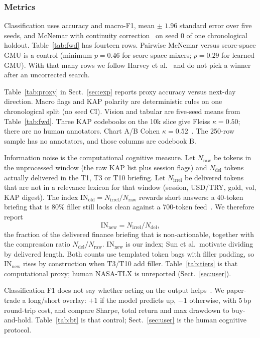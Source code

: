 \documentclass{llncs}
\begin{document}
\subsubsection{Metrics}
\label{sec:metrics}
Classification uses accuracy and macro-F1, mean $\pm$ $1.96$ standard error over five seeds, and McNemar with continuity correction~\cite{dietterich1998approx} on seed 0 of one chronological holdout. Table~\ref{tab:fwd} has fourteen rows. Pairwise McNemar versus score-space GMU is a control (minimum $p=0.46$ for score-space mixers; $p=0.29$ for learned GMU). With that many rows we follow Harvey et al.~\cite{harvey2016and} and do not pick a winner after an uncorrected search.

Table~\ref{tab:proxy} in Sect.~\ref{sec:exp} reports proxy accuracy versus next-day direction. Macro flags and KAP polarity are deterministic rules on one chronological split (no seed CI). Vision and tabular are five-seed means from Table~\ref{tab:fwd}. Three KAP codebooks on the 10k slice give Fleiss $\kappa=0.50$; there are no human annotators. Chart A/B Cohen $\kappa=0.52$~\cite{cohen1960kappa}. The 250-row sample has no annotators, and those columns are codebook B.

Information noise is the computational cognitive measure. Let $N_{\mathrm{raw}}$ be tokens in the unprocessed window (the raw KAP list plus session flags) and $N_{\mathrm{del}}$ tokens actually delivered in the T1, T3 or T10 briefing. Let $N_{\mathrm{irrel}}$ be delivered tokens that are not in a relevance lexicon for that window (session, USD/TRY, gold, vol, KAP digest). The index $\mathrm{IN}_{\mathrm{old}}=N_{\mathrm{irrel}}/N_{\mathrm{raw}}$ rewards short answers: a 40-token briefing that is 80\% filler still looks clean against a 700-token feed~\cite{sun2019compare}. We therefore report
\begin{equation}
\mathrm{IN}_{\mathrm{new}}=N_{\mathrm{irrel}}/N_{\mathrm{del}},
\label{eq:innew}
\end{equation}
the fraction of the delivered finance briefing that is non-actionable, together with the compression ratio $N_{\mathrm{del}}/N_{\mathrm{raw}}$. $\mathrm{IN}_{\mathrm{new}}$ is our index; Sun et al.\ motivate dividing by delivered length. Both counts use templated token bags with filler padding, so $\mathrm{IN}_{\mathrm{new}}$ rises by construction when T3/T10 add filler. Table~\ref{tab:tiers} is that computational proxy; human NASA-TLX is unreported (Sect.~\ref{sec:user}).

Classification F1 does not say whether acting on the output helps~\cite{findlater2009adaptive}. We paper-trade a long/short overlay: $+1$ if the model predicts up, $-1$ otherwise, with 5\,bp round-trip cost, and compare Sharpe, total return and max drawdown to buy-and-hold. Table~\ref{tab:bt} is that control; Sect.~\ref{sec:user} is the human cognitive protocol.
\end{document}
